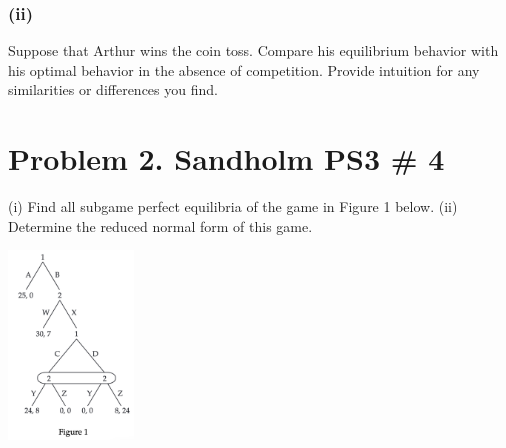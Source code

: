 \documentclass[10pt, a4paper]{article}
\begin{document}
  \subsubsection*{(ii)} 
  Suppose that Arthur wins the coin toss. Compare his equilibrium behavior with his optimal behavior in the absence of competition. Provide intuition for any similarities or differences you find.
\section*{Problem 2. Sandholm PS3 \# 4}
  (i) Find all subgame perfect equilibria of the game in Figure 1 below.
  (ii) Determine the reduced normal form of this game. 
  \begin{center}
    \includegraphics[width = 0.25\textwidth]{fig1.png}
  \end{center}
\end{document}
